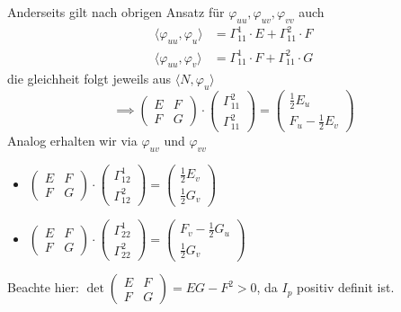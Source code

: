 \documentclass[../main.tex]{subfiles}
\begin{document}
Anderseits gilt nach obrigen Ansatz für $\varphi_{uu},\varphi_{uv},\varphi_{vv}$ auch \begin{align*}
    \langle\varphi_{uu},\varphi_{u}\rangle &= \Gamma_{11}^{1}\cdot E + \Gamma_{11}^{2}\cdot F\\
    \langle\varphi_{uu},\varphi_{v}\rangle &= \Gamma_{11}^{1}\cdot F + \Gamma_{11}^{2}\cdot G
\end{align*} die gleichheit folgt jeweils aus $\langle N,\varphi_{u}\rangle$
$$\implies \begin{pmatrix}
    E&F\\F&G
\end{pmatrix}\cdot \begin{pmatrix}
    \Gamma_{11}^{2}\\\Gamma_{11}^{2}
\end{pmatrix} = \begin{pmatrix}
    \frac{1}{2} E_{u}\\ F_{u}-\frac{1}{2}E_{v}
\end{pmatrix}$$
Analog erhalten wir via $\varphi_{uv}$ und $\varphi_{vv}$ \begin{itemize}
    \item $\begin{pmatrix}
        E&F\\F&G
    \end{pmatrix}\cdot\begin{pmatrix}
        \Gamma_{12}^{1}\\\Gamma_{12}^{2}
    \end{pmatrix} = \begin{pmatrix}
        \frac{1}{2}E_{v}\\\frac{1}{2}G_{v}
    \end{pmatrix}$
    \item $\begin{pmatrix}
        E&F\\F&G
    \end{pmatrix}\cdot\begin{pmatrix}
        \Gamma_{22}^{1}\\\Gamma_{22}^{2}
    \end{pmatrix} = \begin{pmatrix}
        F_{v}-\frac{1}{2}G_{u}\\\frac{1}{2}G_{v}
    \end{pmatrix}$
\end{itemize} Beachte hier: $\det{\begin{pmatrix}
    E&F\\F&G
\end{pmatrix}} = EG-F^{2} > 0$, da $I_{p}$ positiv definit ist.
\end{document}
